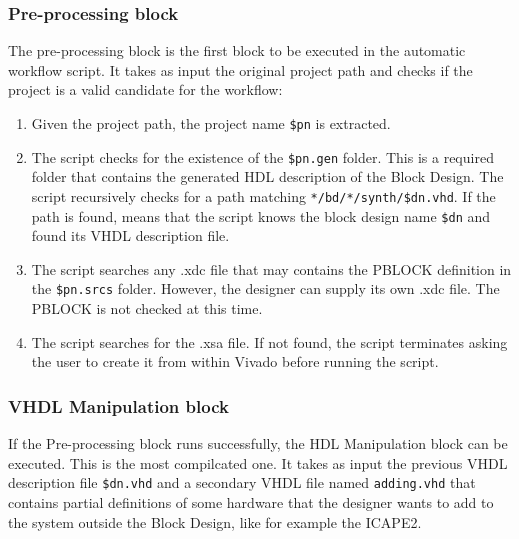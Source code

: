 \subsubsection{Pre-processing block}
The pre-processing block is the first block to be executed in the automatic workflow script. It takes as input the original project path and checks if the project is a valid candidate for the workflow:

\begin{enumerate}
    \item Given the project path, the project name \texttt{\$pn} is extracted.
    \item The script checks for the existence of the \texttt{\$pn.gen} folder. This is a required folder that contains the generated HDL description of the Block Design. The script recursively checks for a path matching \texttt{*/bd/*/synth/\$dn.vhd}. If the path is found, means that the script knows the block design name \texttt{\$dn} and found its VHDL description file.
    \item The script searches any .xdc file that may contains the PBLOCK definition in the \texttt{\$pn.srcs} folder. However, the designer can supply its own .xdc file. The PBLOCK is not checked at this time.
    \item The script searches for the .xsa file. If not found, the script terminates asking the user to create it from within Vivado before running the script.
\end{enumerate}

\subsubsection{VHDL Manipulation block}
If the Pre-processing block runs successfully, the HDL Manipulation block can be executed. This is the most compilcated one. It takes as input the previous VHDL description file \texttt{\$dn.vhd} and a secondary VHDL file named \texttt{adding.vhd} that contains partial definitions of some hardware that the designer wants to add to the system outside the Block Design, like for example the ICAPE2. 

